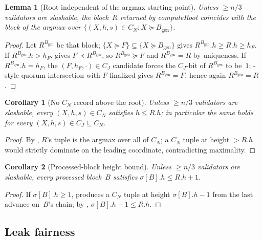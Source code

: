 \documentclass{article}
\newcommand{\genesis}{\ensuremath{B_{\mathrm{gen}}}}
\newcommand{\computeRoot}{\textsf{computeRoot}\xspace}
\theoremstyle{plain}
\newtheorem{corollary}{Corollary}
\newtheorem{lemma}{Lemma}
\theoremstyle{definition}
\theoremstyle{remark}
\begin{document}
\begin{lemma}[Root independent of the argmax starting point]\label{rev:lem:Rs-start-anywhere}
Unless $\geq n/3$ validators are slashable, the block~$R$ returned by \computeRoot coincides with the block of the argmax over $\{(X,h,s) \in C_N : X \succeq \genesis\}$.
\end{lemma}

\begin{proof}
Let $R^{\genesis}$ be that block; $\{X \succeq F\} \subseteq \{X \succeq \genesis\}$ gives $R^{\genesis}.h \geq R.h \geq h_{F}$.
If $R^{\genesis}.h > h_{F}$,  gives $F \prec R^{\genesis}$, so $R^{\genesis} \succeq F$ and $R^{\genesis} = R$ by uniqueness.
If $R^{\genesis}.h = h_{F}$, the $(F, h_{F}, \cdot) \in C_J$ candidate forces the $C_J$-bit of $R^{\genesis}$ to be~$1$; -style quorum intersection with $F$ finalized gives $R^{\genesis} = F$, hence again $R^{\genesis} = R$.
\end{proof}

\begin{corollary}[No $C_N$ record above the root]\label{rev:cor:no-high-cn}
Unless $\geq n/3$ validators are slashable, every $(X, h, s) \in C_N$ satisfies $h \leq R.h$; in particular the same holds for every $(X, h, s) \in C_J \subseteq C_N$.
\end{corollary}

\begin{proof}
By , $R$'s tuple is the argmax over all of $C_N$; a $C_N$ tuple at height $> R.h$ would strictly dominate on the leading coordinate, contradicting maximality.
\end{proof}

\begin{corollary}[Processed-block height bound]\label{rev:cor:processed-height-bound}
Unless $\geq n/3$ validators are slashable, every processed block~$B$ satisfies $\sigma[B].h \leq R.h + 1$.
\end{corollary}

\begin{proof}
If $\sigma[B].h \geq 1$,  produces a $C_N$ tuple at height $\sigma[B].h - 1$ from the last advance on~$B$'s chain; by , $\sigma[B].h - 1 \leq R.h$.
\end{proof}

\subsection{Leak fairness}\label{rev:sec:leak-fairness}
\end{document}
